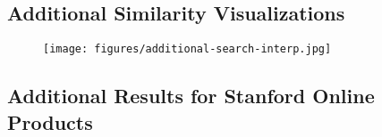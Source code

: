 \documentclass{article} %
\begin{document}
\newpage
\subsection{Additional Similarity Visualizations}

\begin{figure}[h]
\centering
\texttt{[image: figures/additional-search-interp.jpg]}
\label{fig:additional-results}
\end{figure}


\newpage

\subsection{Additional Results for Stanford Online Products}
\end{document}
